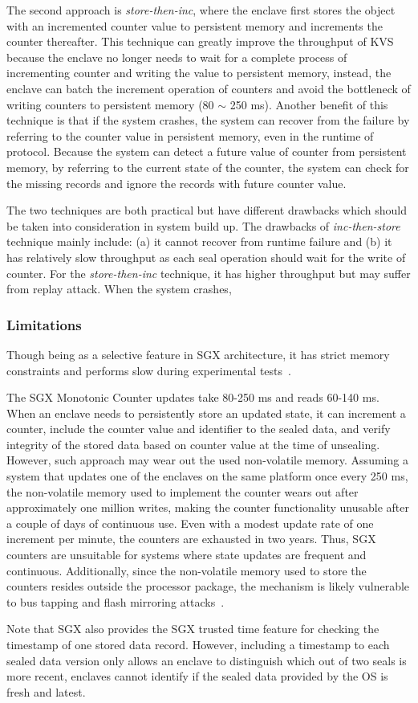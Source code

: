 The second approach is \textit{store-then-inc}, where the enclave first stores the object with 
an incremented counter value to persistent memory and increments the counter thereafter.
This technique can greatly improve the throughput of KVS because the enclave no longer needs to 
wait for a complete process of incrementing counter and writing the value to persistent memory,
instead, the enclave can batch the increment operation of counters and avoid the bottleneck 
of writing counters to persistent memory (80 $\sim$ 250 ms). Another benefit of this technique is 
that if the system crashes, the system can recover from the failure by referring to the counter 
value in persistent memory, even in the runtime of protocol. Because the system can detect a future 
value of counter from persistent memory, by referring to the current state of the counter, the 
system can check for the missing records and ignore the records with future counter value.

The two techniques are both practical but have different drawbacks which should be taken into 
consideration in system build up. The drawbacks of \textit{inc-then-store} technique mainly include: 
(a) it cannot recover from runtime failure and (b) it has relatively slow throughput as each seal operation 
should wait for the write of counter. For the \textit{store-then-inc} technique, it has higher throughput 
but may suffer from replay attack. When the system crashes, 

\subsubsection{Limitations}
Though being as a selective feature in SGX architecture, it has strict memory constraints and performs slow during experimental tests~\cite{}. 

The SGX Monotonic Counter updates take 80-250 ms and reads 60-140 ms. When an enclave needs to persistently store an updated state, it can increment a counter, include the counter value and identifier to the sealed data, and verify integrity of the stored data based on counter value at the time of unsealing. However, such approach may wear out the used non-volatile memory. Assuming a system that updates one of the enclaves on the same platform once every 250 ms, the non-volatile memory used to implement the counter wears out after approximately one million writes, making the counter functionality unusable after a couple of days of continuous use. Even with a modest update rate of one increment per minute, the counters are exhausted in two years. Thus, SGX counters are unsuitable for systems where state updates are frequent and continuous. Additionally, since the non-volatile memory used to store the counters resides outside the processor package, the mechanism is likely vulnerable to bus tapping and flash mirroring attacks~\cite{}.

Note that SGX also provides the SGX trusted time feature for checking the timestamp of one stored data record. However, including a timestamp to each sealed data version only allows an enclave to distinguish which out of two seals is more recent, enclaves cannot identify if the sealed data provided by the OS is fresh and latest.



